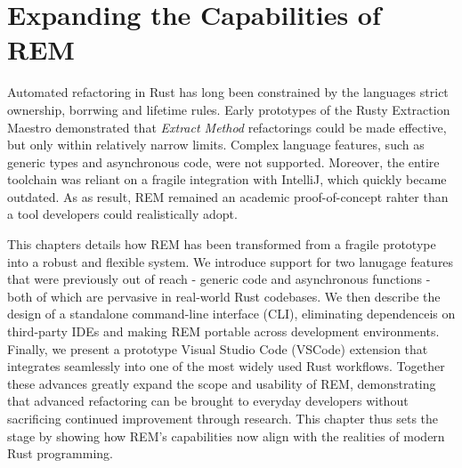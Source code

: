 \chapter{Expanding the Capabilities of REM}
\label{chap:expanding_rem}



Automated refactoring in Rust has long been constrained by the languages strict
ownership, borrwing and lifetime rules. Early prototypes of the Rusty Extraction
Maestro demonstrated that \emph{Extract Method} refactorings could be made
effective, but only within relatively narrow limits. Complex language features,
such as generic types and asynchronous code, were not supported. Moreover, the
entire toolchain was reliant on a fragile integration with IntelliJ, which
quickly became outdated. As as result, REM remained an academic proof-of-concept
rahter than a tool developers could realistically adopt.

This chapters details how REM has been transformed from a fragile prototype into
a robust and flexible system. We introduce support for two lanugage features
that were previously out of reach - generic code and asynchronous functions -
both of which are pervasive in real-world Rust codebases. We then describe the
design of a standalone command-line interface (CLI), eliminating dependenceis on
third-party IDEs and making REM portable across development environments.
Finally, we present a prototype Visual Studio Code (VSCode) extension that
integrates seamlessly into one of the most widely used Rust workflows. Together
these advances greatly expand the scope and usability of REM, demonstrating that
advanced refactoring can be brought to everyday developers without sacrificing
continued improvement through research. This chapter thus sets the stage by
showing how REM's capabilities now align with the realities of modern Rust programming.

